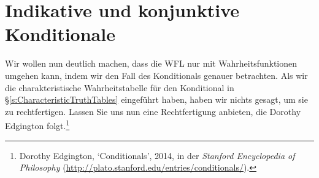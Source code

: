 
\section{Indikative und konjunktive Konditionale}\label{s:IndicativeSubjunctive}
Wir wollen nun deutlich machen, dass die WFL nur mit Wahrheitsfunktionen umgehen kann, indem wir den Fall des Konditionals genauer betrachten. Als wir die charakteristische Wahrheitstabelle für den Konditional in \S\ref{s:CharacteristicTruthTables} eingeführt haben, haben wir nichts gesagt, um sie zu rechtfertigen. Lassen Sie uns nun eine Rechtfertigung anbieten, die Dorothy Edgington folgt.\footnote{Dorothy Edgington, `Conditionals', 2014, in der \emph{Stanford Encyclopedia of Philosophy} (\url{http://plato.stanford.edu/entries/conditionals/}).} 

